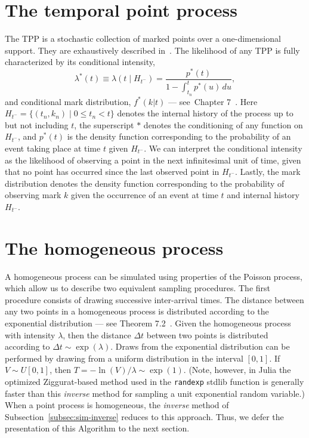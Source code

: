 \documentclass{juliacon}
\numberwithin{equation}{section}
\begin{document}
\section{The temporal point process}

The TPP is a stochastic collection of marked points over a one-dimensional support. They are exhaustively described in~\cite{daley2003}. The likelihood of any TPP is fully characterized by its conditional intensity,
\begin{equation}\label{eq:lambda}
  \lambda^\ast (t) \equiv \lambda(t \mid H_{t^-} ) = \frac{p^\ast(t)}{1 - \int_{t_n}^{t} p^\ast(u) \, du},
\end{equation}
and conditional mark distribution, \( f^*(k | t) \) --- see~Chapter 7~\cite{daley2003}. Here \( H_{t^-} = \{ (t_n, k_n) \mid 0 \leq t_n < t \} \) denotes the internal history of the process up to but not including \( t \), the superscript \( \ast \) denotes the conditioning of any function on \( H_{t^-} \), and \( p^\ast(t) \) is the density function corresponding to the probability of an event taking place at time \( t \) given \( H_{t^-} \). We can interpret the conditional intensity as the likelihood of observing a point in the next infinitesimal unit of time, given that no point has occurred since the last observed point in \( H_{t^-} \). Lastly, the mark distribution denotes the density function corresponding to the probability of observing mark \( k \) given the occurrence of an event at time \( t \) and internal history \( H_{t^-} \).

\section{The homogeneous process}

A homogeneous process can be simulated using properties of the Poisson process, which allow us to describe two equivalent sampling procedures. The first procedure consists of drawing successive inter-arrival times. The distance between any two points in a homogeneous process is distributed according to the exponential distribution --- see Theorem 7.2~\cite{last2017}. Given the homogeneous process with intensity $\lambda$, then the distance \( \Delta t \) between two points is distributed according to $\Delta t \sim \exp(\lambda)$. Draws from the exponential distribution can be performed by drawing from a uniform distribution in the interval $[0, 1]$. If $V \sim U[0, 1]$, then \( T = - \ln(V) / \lambda \sim \exp(1) \). (Note, however, in Julia the optimized Ziggurat-based method used in the \texttt{randexp} stdlib function is generally faster than this \textit{inverse} method for sampling a unit exponential random variable.) When a point process is homogeneous, the \textit{inverse} method of Subsection~\ref{subsec:sim-inverse} reduces to this approach. Thus, we defer the presentation of this Algorithm to the next section.
\end{document}
